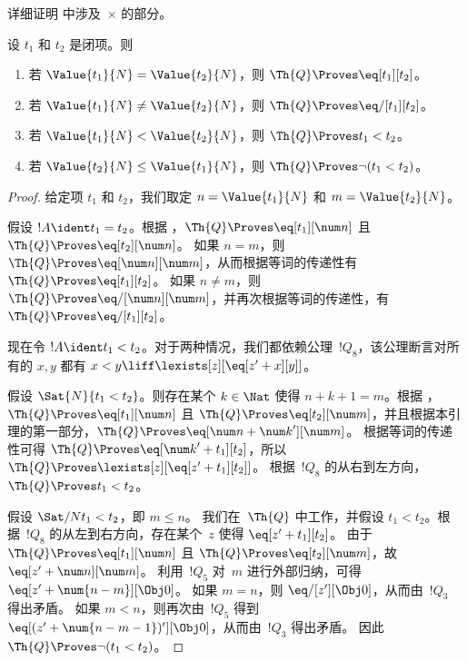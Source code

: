 \documentclass[../../../include/open-logic-section]{subfiles}
\begin{document}
\begin{prob}
详细证明  中涉及~$\times$ 的部分。
\end{prob}

\begin{lem}
设 $t_1$ 和 $t_2$ 是闭项。则
\begin{enumerate}
\item 若 $\Value{t_1}{N} = \Value{t_2}{N}$，则 $\Th{Q} \Proves \eq[t_1][t_2]$。
\item 若 $\Value{t_1}{N} \neq \Value{t_2}{N}$，则 $\Th{Q} \Proves \eq/[t_1][t_2]$。
\item 若 $\Value{t_1}{N} < \Value{t_2}{N}$，则 $\Th{Q} \Proves t_1 < t_2$。
\item 若 $\Value{t_2}{N} \leq \Value{t_1}{N}$，则 $\Th{Q} \Proves \lnot(t_1 < t_2)$。
\end{enumerate}
\end{lem}

\begin{proof}
给定项 $t_1$ 和 $t_2$，我们取定 $n = \Value{t_1}{N}$ 和 $m = \Value{t_2}{N}$。

假设 $!A \ident t_1 = t_2$。根据 ，$\Th{Q} \Proves \eq[t_1][\num n]$ 且 $\Th{Q} \Proves \eq[t_2][\num n]$。
如果 $n = m$，则 $\Th{Q} \Proves \eq[\num n][\num m]$，从而根据等词的传递性有 $\Th{Q} \Proves \eq[t_1][t_2]$。
如果 $n \neq m$，则 $\Th{Q} \Proves \eq/[\num n][\num m]$，并再次根据等词的传递性，有 $\Th{Q} \Proves \eq/[t_1][t_2]$。

现在令 $!A \ident t_1 < t_2$。对于两种情况，我们都依赖公理~$!Q_8$，该公理断言对所有的 $x,y$ 都有 $x < y \liff \lexists[z][\eq[z' + x][y]]$。

假设 $\Sat{N}{t_1 < t_2}$。则存在某个 $k \in \Nat$ 使得 $n + k + 1 = m$。根据 ，$\Th{Q} \Proves \eq[t_1][\num n]$ 且 $\Th{Q} \Proves \eq[t_2][\num m]$，并且根据本引理的第一部分，$\Th{Q} \Proves \eq[\num n + {\num k}'][\num m]$。
根据等词的传递性可得 $\Th{Q} \Proves \eq[{\num k}' + t_1][t_2]$，所以 $\Th{Q} \Proves \lexists[z][\eq[z' + t_1][t_2]]$。
根据~$!Q_8$ 的从右到左方向，$\Th{Q} \Proves t_1 < t_2$。

假设 $\Sat/{N}{t_1 < t_2}$，即 $m \leq n$。
%
我们在~$\Th{Q}$ 中工作，并假设 $t_1 < t_2$。根据~$!Q_8$ 的从左到右方向，存在某个~$z$ 使得 $\eq[z' + t_1][t_2]$。
由于 $\Th{Q} \Proves \eq[t_1][\num n]$ 且 $\Th{Q} \Proves \eq[t_2][\num m]$，故 $\eq[z' + \num n][\num m]$。
%
利用~$!Q_5$ 对~$m$ 进行外部归纳，可得 $\eq[z' + \num{n - m}][\Obj 0]$。
如果 $m = n$，则 $\eq/[z'][\Obj 0]$，从而由~$!Q_3$ 得出矛盾。
如果 $m < n$，则再次由~$!Q_5$ 得到 $\eq[(z' + \num{n - m - 1})'][\Obj 0]$，从而由~$!Q_3$ 得出矛盾。
因此 $\Th{Q} \Proves \lnot(t_1 < t_2)$。
\end{proof}
\end{document}
